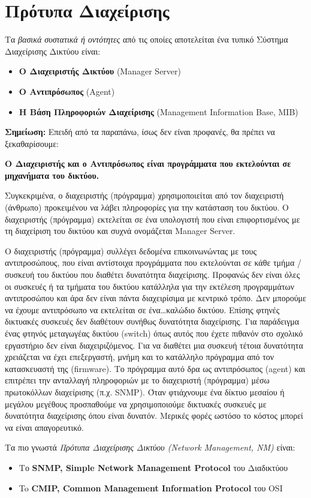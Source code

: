 %
%
\section{Πρότυπα Διαχείρισης}

Τα \emph{βασικά συστατικά ή οντότητες} από τις οποίες αποτελείται ένα τυπικό Σύστημα Διαχείρισης Δικτύου είναι:

\begin{itemize}
\item \textbf{Ο Διαχειριστής Δικτύου} (Manager Server)
\item \textbf{Ο Αντιπρόσωπος} (Agent)
\item \textbf{Η Βάση Πληροφοριών Διαχείρισης} (Management Information Base, MIB)
\end{itemize}

\begin{inthebox}
\textbf{Σημείωση:} Επειδή από τα παραπάνω, ίσως δεν είναι προφανές, θα πρέπει να ξεκαθαρίσουμε:

\textbf{Ο Διαχειριστής και ο Αντιπρόσωπος είναι προγράμματα που εκτελούνται σε μηχανήματα του δικτύου.}

Συγκεκριμένα, ο διαχειριστής (πρόγραμμα) χρησιμοποιείται από τον διαχειριστή (άνθρωπο) προκειμένου να λάβει πληροφορίες για την κατάσταση του δικτύου. Ο διαχειριστής (πρόγραμμα) εκτελείται σε ένα υπολογιστή που είναι επιφορτισμένος με τη διαχείριση του δικτύου και συχνά ονομάζεται Manager Server. 

Ο διαχειριστής (πρόγραμμα) συλλέγει δεδομένα επικοινωνώντας με τους αντιπροσώπους, που είναι αντίστοιχα προγράμματα που εκτελούνται σε κάθε τμήμα / συσκευή του δικτύου που διαθέτει δυνατότητα διαχείρισης. Προφανώς δεν είναι όλες οι συσκευές ή τα τμήματα του δικτύου κατάλληλα για την εκτέλεση προγραμμάτων αντιπροσώπου και άρα δεν είναι πάντα διαχειρίσιμα με κεντρικό τρόπο.  Δεν μπορούμε να έχουμε αντιπρόσωπο να εκτελείται σε ένα\ldots καλώδιο δικτύου. Επίσης φτηνές δικτυακές συσκευές δεν διαθέτουν συνήθως δυνατότητα διαχείρισης. Για παράδειγμα ένας φτηνός μεταγωγέας δικτύου (switch) όπως αυτός που έχετε πιθανόν στο σχολικό εργαστήριο δεν είναι διαχειριζόμενος. Για να διαθέτει μια συσκευή τέτοια δυνατότητα χρειάζεται να έχει επεξεργαστή, μνήμη και το κατάλληλο πρόγραμμα από τον κατασκευαστή της (firmware). Το πρόγραμμα αυτό δρα ως αντιπρόσωπος (agent) και επιτρέπει την ανταλλαγή πληροφοριών με το διαχειριστή (πρόγραμμα) μέσω πρωτοκόλλων διαχείρισης (π.χ. SNMP). Όταν φτιάχνουμε ένα δίκτυο μεσαίου ή μεγάλου μεγέθους προσπαθούμε να χρησιμοποιούμε δικτυακές συσκευές με δυνατότητα διαχείρισης όπου είναι δυνατόν. Μερικές φορές ωστόσο το κόστος μπορεί να είναι απαγορευτικό.\\
\end{inthebox}

Τα πιο γνωστά \emph{Πρότυπα Διαχείρισης Δικτύου (Network Management, NM)} είναι:

\begin{itemize}
\item Το \textbf{SNMP, Simple Network Management Protocol} του Διαδικτύου
\item To \textbf{CMIP, Common Management Information Protocol} του OSI
\end{itemize}
